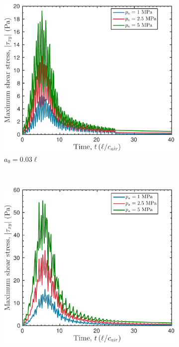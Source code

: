 \begin{figure}
  \centering
  \begin{subfigure}[b]{0.49\textwidth}
    \includegraphics[width=\textwidth]{./figs/lung_figs/rmawave_1_A10,25,50_a03_tauxy_07-Mar-2017}
    \caption{\label{fig:stress_multi-pa_a03} $a_0 = 0.03\ell$}
  \end{subfigure}
  ~ 
  \begin{subfigure}[b]{0.49\textwidth}
    \includegraphics[width=\textwidth]{./figs/lung_figs/rmawave_1_A10,25,50_a10_tauxy_27-Feb-2017}

\end{subfigure}
\end{figure}
